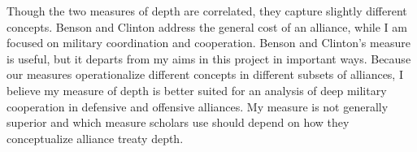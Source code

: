 \documentclass[12pt]{article}
\begin{document}
Though the two measures of depth are correlated, they capture slightly different concepts. 
Benson and Clinton address the general cost of an alliance, while I am focused on military coordination and cooperation. 
Benson and Clinton's measure is useful, but it departs from my aims in this project in important ways. 
Because our measures operationalize different concepts in different subsets of alliances, I believe my measure of depth is better suited for an analysis of deep military cooperation in defensive and offensive alliances. 
My measure is not generally superior and which measure scholars use should depend on how they conceptualize alliance treaty depth. 



  
 
\end{document}
